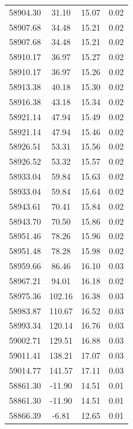 \begin{longtable}{|c|c|c|c|}
 58904.30 &   31.10 &       15.07 &          0.02 \\
 58907.68 &   34.48 &       15.21 &          0.02 \\
 58907.68 &   34.48 &       15.21 &          0.02 \\
 58910.17 &   36.97 &       15.27 &          0.02 \\
 58910.17 &   36.97 &       15.26 &          0.02 \\
 58913.38 &   40.18 &       15.30 &          0.02 \\
 58916.38 &   43.18 &       15.34 &          0.02 \\
 58921.14 &   47.94 &       15.49 &          0.02 \\
 58921.14 &   47.94 &       15.46 &          0.02 \\
 58926.51 &   53.31 &       15.56 &          0.02 \\
 58926.52 &   53.32 &       15.57 &          0.02 \\
 58933.04 &   59.84 &       15.63 &          0.02 \\
 58933.04 &   59.84 &       15.64 &          0.02 \\
 58943.61 &   70.41 &       15.84 &          0.02 \\
 58943.70 &   70.50 &       15.86 &          0.02 \\
 58951.46 &   78.26 &       15.96 &          0.02 \\
 58951.48 &   78.28 &       15.98 &          0.02 \\
 58959.66 &   86.46 &       16.10 &          0.03 \\
 58967.21 &   94.01 &       16.18 &          0.02 \\
 58975.36 &  102.16 &       16.38 &          0.03 \\
 58983.87 &  110.67 &       16.52 &          0.03 \\
 58993.34 &  120.14 &       16.76 &          0.03 \\
 59002.71 &  129.51 &       16.88 &          0.03 \\
 59011.41 &  138.21 &       17.07 &          0.03 \\
 59014.77 &  141.57 &       17.11 &          0.03 \\
 58861.30 &  -11.90 &       14.51 &          0.01 \\
 58861.30 &  -11.90 &       14.51 &          0.01 \\
 58866.39 &   -6.81 &       12.65 &          0.01 \\

\end{longtable}
